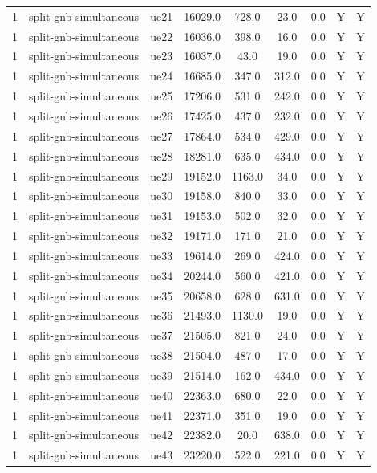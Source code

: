 \begin{table}[ht]
\begin{tabular}{|c|c|c|c|c|c|c|c|c|}
1 & split-gnb-simultaneous & ue21 & 16029.0 & 728.0 & 23.0 & 0.0 & Y & Y \\
1 & split-gnb-simultaneous & ue22 & 16036.0 & 398.0 & 16.0 & 0.0 & Y & Y \\
1 & split-gnb-simultaneous & ue23 & 16037.0 & 43.0 & 19.0 & 0.0 & Y & Y \\
1 & split-gnb-simultaneous & ue24 & 16685.0 & 347.0 & 312.0 & 0.0 & Y & Y \\
1 & split-gnb-simultaneous & ue25 & 17206.0 & 531.0 & 242.0 & 0.0 & Y & Y \\
1 & split-gnb-simultaneous & ue26 & 17425.0 & 437.0 & 232.0 & 0.0 & Y & Y \\
1 & split-gnb-simultaneous & ue27 & 17864.0 & 534.0 & 429.0 & 0.0 & Y & Y \\
1 & split-gnb-simultaneous & ue28 & 18281.0 & 635.0 & 434.0 & 0.0 & Y & Y \\
1 & split-gnb-simultaneous & ue29 & 19152.0 & 1163.0 & 34.0 & 0.0 & Y & Y \\
1 & split-gnb-simultaneous & ue30 & 19158.0 & 840.0 & 33.0 & 0.0 & Y & Y \\
1 & split-gnb-simultaneous & ue31 & 19153.0 & 502.0 & 32.0 & 0.0 & Y & Y \\
1 & split-gnb-simultaneous & ue32 & 19171.0 & 171.0 & 21.0 & 0.0 & Y & Y \\
1 & split-gnb-simultaneous & ue33 & 19614.0 & 269.0 & 424.0 & 0.0 & Y & Y \\
1 & split-gnb-simultaneous & ue34 & 20244.0 & 560.0 & 421.0 & 0.0 & Y & Y \\
1 & split-gnb-simultaneous & ue35 & 20658.0 & 628.0 & 631.0 & 0.0 & Y & Y \\
1 & split-gnb-simultaneous & ue36 & 21493.0 & 1130.0 & 19.0 & 0.0 & Y & Y \\
1 & split-gnb-simultaneous & ue37 & 21505.0 & 821.0 & 24.0 & 0.0 & Y & Y \\
1 & split-gnb-simultaneous & ue38 & 21504.0 & 487.0 & 17.0 & 0.0 & Y & Y \\
1 & split-gnb-simultaneous & ue39 & 21514.0 & 162.0 & 434.0 & 0.0 & Y & Y \\
1 & split-gnb-simultaneous & ue40 & 22363.0 & 680.0 & 22.0 & 0.0 & Y & Y \\
1 & split-gnb-simultaneous & ue41 & 22371.0 & 351.0 & 19.0 & 0.0 & Y & Y \\
1 & split-gnb-simultaneous & ue42 & 22382.0 & 20.0 & 638.0 & 0.0 & Y & Y \\
1 & split-gnb-simultaneous & ue43 & 23220.0 & 522.0 & 221.0 & 0.0 & Y & Y \\

\end{tabular}
\end{table}
